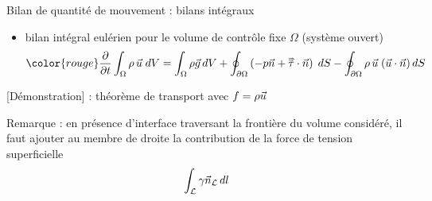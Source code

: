 \begin{frame}{Bilan de quantité de mouvement : bilans intégraux}
\begin{itemize}
\smallskip

\pause
\item
  bilan intégral eulérien pour le volume de contrôle fixe $\Omega$ (système ouvert)
	\begin{equation}
		\color{rouge}
		\dpdt{} \int_{\Omega} \rho \, \myvec{u} \; dV 
		=
		\int_{\Omega} \rho \myvec{g} \, dV 
		+ \oint_{\partial \Omega} \left( -p \myvec{n} + \mytensor{\tau} \cdot \myvec{n}\right) \; dS
		- \oint_{\partial \Omega} \rho \, \myvec{u}\; (\myvec{u}\cdot \myvec{n}) \, dS
		\label{eq:bilan_global_eulerien_qdm}
	\end{equation}
\end{itemize}

{\color{vert} [Démonstration] :} théorème de transport avec $f= \rho \vec{u}$

\medskip
\pause

\color{gris} Remarque : en présence d'interface traversant la frontière du volume considéré, il faut ajouter au membre de droite la contribution de la force de tension superficielle
$$
\int_{\mathcal{L}} \gamma \vec{n}_{\cal L} \, dl
$$


\end{frame}
%
%
%
%
